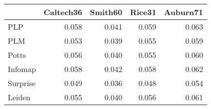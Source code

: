 \begin{tabular}{lrrrr}
\toprule
{} & Caltech36 & Smith60 & Rice31 & Auburn71 \\
\midrule
PLP      &     0.058 &   0.041 &  0.059 &    0.063 \\
PLM      &     0.053 &   0.039 &  0.055 &    0.059 \\
Potts    &     0.056 &   0.040 &  0.055 &    0.060 \\
Infomap  &     0.058 &   0.042 &  0.058 &    0.062 \\
Surprise &     0.049 &   0.036 &  0.048 &    0.054 \\
Leiden   &     0.055 &   0.040 &  0.056 &    0.061 \\
\bottomrule
\end{tabular}
